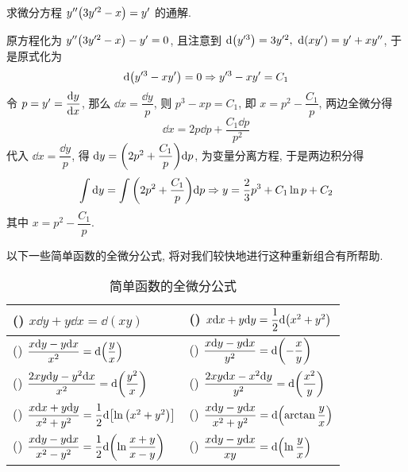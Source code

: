 \begin{example}
    求微分方程 $y''\qty(3y'^2-x)=y'$ 的通解.
\end{example}
\begin{solution}
    原方程化为 $y''\qty(3y'^2-x)-y'=0$, 且注意到 $\dd \qty(y'^3)=3y'^2,~\dd \qty(xy')=y'+xy''$, 于是原式化为
    $$\dd \qty(y'^3-xy')=0\Rightarrow y'^3-xy'=C_1$$
    令 $p=y'=\displaystyle\dv{y}{x}$, 那么 $\dd x=\dfrac{\dd y}{p}$, 则 $p^3-xp=C_1$, 即 $x=p^2-\dfrac{C_1}{p}$, 
    两边全微分得 $$\dd x=2p\dd p+\dfrac{C_1\dd p}{p^2}$$
    代入 $\dd x=\dfrac{\dd y}{p}$, 得 $\dd y=\qty(2p^2+\dfrac{C_1}{p})\dd p$, 为变量分离方程, 于是两边积分得
    $$\int\dd y=\int\qty(2p^2+\dfrac{C_1}{p})\dd p\Rightarrow y=\dfrac{2}{3}p^3+C_1\ln p+C_2$$
    其中 $x=p^2-\dfrac{C_1}{p}.$
\end{solution}


以下一些简单函数的全微分公式, 将对我们较快地进行这种重新组合有所帮助.
\setcounter{magicrownumbers}{0}
\begin{table}[H]
    \centering
    \caption{简单函数的全微分公式}
    \begin{tabular}{l l}
        (\rownumber{}) $x\dd y+y\dd x=\dd (xy)$                                                   & (\rownumber{}) $x\dd x+y\dd y=\dfrac{1}{2}\dd \qty(x^2+y^2)$                 \\
        \midrule
        (\rownumber{}) $\dfrac{x\dd y-y\dd x}{x^2}=\dd \qty(\dfrac{y}{x})$                        & (\rownumber{}) $\dfrac{x\dd y-y\dd x}{y^2}=\dd \qty(-\dfrac{x}{y})$          \\
        (\rownumber{}) $\dfrac{2xy\dd y-y^2\dd x}{x^2}=\dd\qty(\dfrac{y^2}{x})$                   & (\rownumber{}) $\dfrac{2xy\dd x-x^2\dd y}{y^2}=\dd \qty(\dfrac{x^2}{y})$     \\
        \midrule
        (\rownumber{}) $\dfrac{x\dd x+y\dd y}{x^2+y^2}=\dfrac{1}{2}\dd \qty[\ln\qty(x^2+y^2)]$    & (\rownumber{}) $\dfrac{x\dd y-y\dd x}{x^2+y^2}=\dd\qty(\arctan\dfrac{y}{x})$ \\
        (\rownumber{}) $\dfrac{x\dd y-y\dd x}{x^2-y^2}=\dfrac{1}{2}\dd \qty(\ln\dfrac{x+y}{x-y})$ & (\rownumber{}) $\dfrac{x\dd y-y\dd x}{xy}=\dd \qty(\ln\dfrac{y}{x})$         \\
    \end{tabular}
\end{table}

